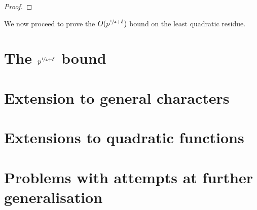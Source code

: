 \documentclass{report}
\begin{document}
\begin{proof}
\begin{comment}
For a fixed $q$, $I(q,t)$ are disjoint as $H<p$. Now, for a pair of different values of $q$, say $q_1$ and $q_2$, let $I(q_1,t_1)$ and $I(q_2,t_2)$ intersect. Then we can say:
$$\frac{N+t_1p}{q_1} \leq \frac{N+H+t_2p}{q_2}$$
$$\text{and}\text{ }\frac{N+t_2p}{q_2} \leq \frac{N+H+t_1p}{q_1}$$
$$\Rightarrow N(q_2-q_1)+(t_1q_2-t_2q_1)p\leq Hq_2<\frac{1}{2}p$$
$$\Rightarrow N(q_1-q_2)+(t_2q_1-t_1q_2)p\leq Hq_1<\frac{1}{2}p$$
$$\Rightarrow N(q_2-q_1)-\frac{1}{2}p < (t_2q_1-t_1q_2)p <N(q_2-q_1)+\frac{1}{2}p$$
Since not more than a single multiple of $p$ can occur in a range of size less than $p$, $t_2q_1-t_1q_2$ can take only one value. Because $q_1$ and $q_2$ are co-prime and $0\leq t_1 \leq q_1$ and $0\leq t_2 \leq q_2$, there is only one pair of $t_1$ and $t_2$ values for a unique $t_2q_1-t_1q_2$. This is because for a unique valuation of $t_2q_1-t_1q_2$, the difference in the valuation of the first term must be same as that of the second term for different values of $t_2$. The values of $t_2q_1$ will be multiples of $q_1$, and for the difference in two such values to be the same as two values of $t_1q_2$, a multiple of $q_2$, the least possible difference can be the l.c.m $q_1q_2$, which cannot occur from given range of $t_1$ and $t_2$.

Hence, for each $q$, there are at least $q-Q$ values of $t\in \{0,1,\ldots q-1\}$ such that $I(q,t)$ are disjoint from all other intervals associated with all $q$.
\end{comment}
\end{proof}

We now proceed to prove the $O(p^{\nicefrac{1}{4}+\delta})$ bound on the least quadratic residue.
%
%
\section{The $p^{\nicefrac{1}{4}+\delta}$ bound}

%
%
\section{Extension to general characters}
%
%
\section{Extensions to quadratic functions}
%
%
\section{Problems with attempts at further generalisation}
%
\end{document}
